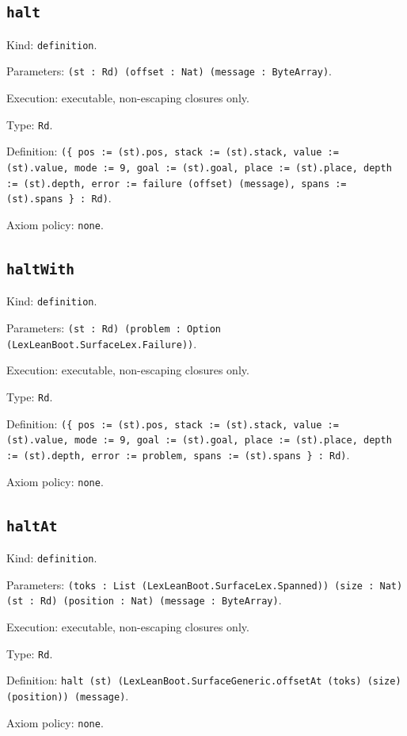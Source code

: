 \documentclass[11pt]{article}
\begin{document}
\subsection*{\texttt{halt}}
\noindent Kind: \texttt{definition}.\par
\noindent Parameters: \texttt{(st : Rd) (offset : Nat) (message : ByteArray)}.\par
\noindent Execution: executable, non-escaping closures only.\par
\noindent Type: \texttt{Rd}.\par
\noindent Definition: \texttt{(\{ pos := (st).pos, stack := (st).stack, value := (st).value, mode := 9, goal := (st).goal, place := (st).place, depth := (st).depth, error := failure (offset) (message), spans := (st).spans \} : Rd)}.\par
\noindent Axiom policy: \texttt{none}.\par
\subsection*{\texttt{haltWith}}
\noindent Kind: \texttt{definition}.\par
\noindent Parameters: \texttt{(st : Rd) (problem : Option (LexLeanBoot.SurfaceLex.Failure))}.\par
\noindent Execution: executable, non-escaping closures only.\par
\noindent Type: \texttt{Rd}.\par
\noindent Definition: \texttt{(\{ pos := (st).pos, stack := (st).stack, value := (st).value, mode := 9, goal := (st).goal, place := (st).place, depth := (st).depth, error := problem, spans := (st).spans \} : Rd)}.\par
\noindent Axiom policy: \texttt{none}.\par
\subsection*{\texttt{haltAt}}
\noindent Kind: \texttt{definition}.\par
\noindent Parameters: \texttt{(toks : List (LexLeanBoot.SurfaceLex.Spanned)) (size : Nat) (st : Rd) (position : Nat) (message : ByteArray)}.\par
\noindent Execution: executable, non-escaping closures only.\par
\noindent Type: \texttt{Rd}.\par
\noindent Definition: \texttt{halt (st) (LexLeanBoot.SurfaceGeneric.offsetAt (toks) (size) (position)) (message)}.\par
\noindent Axiom policy: \texttt{none}.\par
\end{document}
